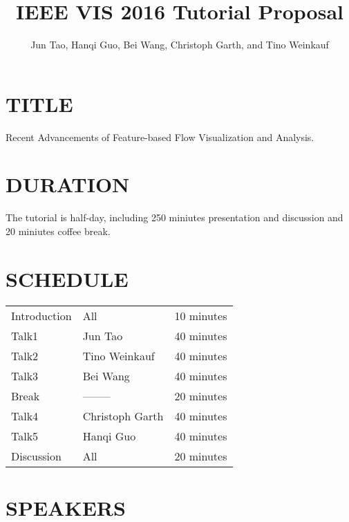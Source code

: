 \documentclass[preprint,journal]{vgtc}       %
\title{IEEE VIS 2016 Tutorial Proposal}
\author{Jun Tao, Hanqi Guo, Bei Wang, Christoph Garth, and Tino Weinkauf}
\begin{document}


\maketitle

\section*{TITLE}
Recent Advancements of Feature-based Flow Visualization and Analysis.

\section*{DURATION}
The tutorial is half-day, including 250 miniutes presentation and discussion and 20 miniutes coffee break.

\section*{SCHEDULE}

\vspace{-0.1in}
\begin{table}[H]
\begin{tabular}{lll}
Introduction & All & 10 minutes\\
Talk1 & Jun Tao & 40 minutes\\
Talk2 & Tino Weinkauf & 40 minutes\\
Talk3 & Bei Wang & 40 minutes\\
Break & -------- & 20 minutes\\
Talk4 & Christoph Garth & 40 minutes\\
Talk5 & Hanqi Guo & 40 minutes\\
Discussion & All & 20 minutes
\end{tabular}
\end{table}

\section*{SPEAKERS}
\end{document}
